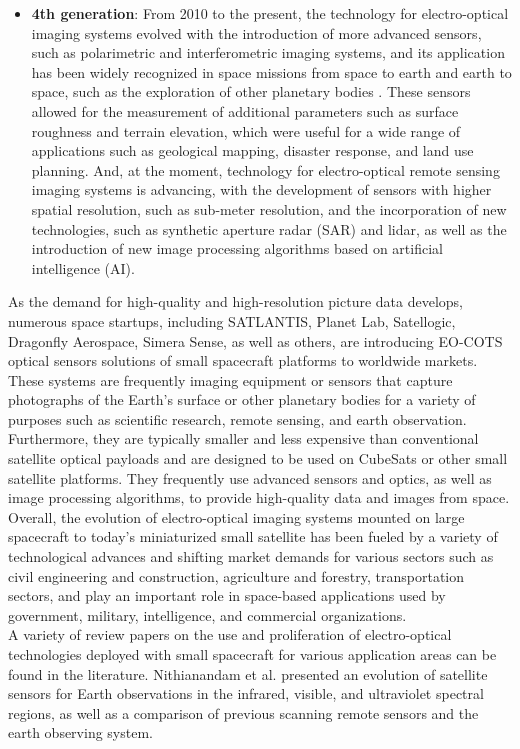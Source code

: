 \documentclass[final,5p,times,twocolumn,authoryear]{elsarticle}
\begin{document}
\begin{itemize}
	\item \textbf{4th generation}: From 2010 to the present, the technology for electro-optical imaging systems evolved with the introduction of more advanced sensors, such as polarimetric and interferometric imaging systems, and its application has been widely recognized in space missions from space to earth and earth to space, such as the exploration of other planetary bodies \citep{clark2003imaging}. These sensors allowed for the measurement of additional parameters such as surface roughness and terrain elevation, which were useful for a wide range of applications such as geological mapping, disaster response, and land use planning.  And, at the moment, technology for electro-optical remote sensing imaging systems is advancing, with the development of sensors with higher spatial resolution, such as sub-meter resolution, and the incorporation of new technologies, such as synthetic aperture radar (SAR) and lidar, as well as the introduction of new image processing algorithms based on artificial intelligence (AI). 
\end{itemize}
As the demand for high-quality and high-resolution picture data develops, numerous space startups, including SATLANTIS, Planet Lab, Satellogic, Dragonfly Aerospace, Simera Sense, as well as others, are introducing EO-COTS optical sensors solutions of small spacecraft platforms to worldwide markets. These systems are frequently imaging equipment or sensors that capture photographs of the Earth's surface or other planetary bodies for a variety of purposes such as scientific research, remote sensing, and earth observation. Furthermore, they are typically smaller and less expensive than conventional satellite optical payloads and are designed to be used on CubeSats or other small satellite platforms. They frequently use advanced sensors and optics, as well as image processing algorithms, to provide high-quality data and images from space.\\
Overall, the evolution of electro-optical imaging systems mounted on large spacecraft to today's miniaturized small satellite has been fueled by a variety of technological advances and shifting market demands for various sectors such as civil engineering and construction, agriculture and forestry, transportation sectors, and play an important role in space-based applications used by government, military, intelligence, and commercial organizations.\\
A variety of review papers on the use and proliferation of electro-optical technologies deployed with small spacecraft for various application areas can be found in the literature. Nithianandam et al. \citep{JNithianandam_1993} presented an evolution of satellite sensors for Earth observations in the infrared, visible, and ultraviolet spectral regions, as well as a comparison of previous scanning remote sensors and the earth observing system.
\end{document}
